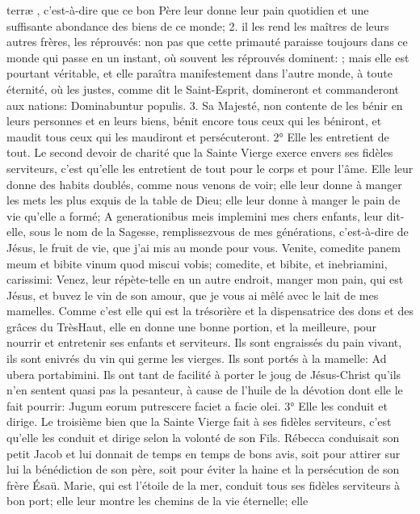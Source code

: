 terræ , c'est-à-dire que ce bon Père leur donne leur pain quotidien et une suffisante abondance des biens de ce
monde; 2. il les rend les maîtres de leurs autres frères, les réprouvés: non pas que cette primauté paraisse
toujours dans ce monde qui passe en un instant, où souvent les réprouvés dominent: ; mais elle est pourtant véritable, et elle paraîtra
manifestement dans l'autre monde, à toute éternité, où les justes, comme dit le Saint-Esprit, domineront et
commanderont aux nations: Dominabuntur populis. 3. Sa Majesté, non contente de les bénir en leurs personnes et
en leurs biens, bénit encore tous ceux qui les béniront, et maudit tous ceux qui les maudiront et persécuteront.
2° Elle les entretient de tout.
 Le second devoir de charité que la Sainte Vierge exerce envers ses fidèles serviteurs, c'est qu'elle les
entretient de tout pour le corps et pour l'âme. Elle leur donne des habits doublés, comme nous venons de voir; elle
leur donne à manger les mets les plus exquis de la table de Dieu; elle leur donne à manger le pain de vie qu'elle a
formé; A generationibus meis implemini mes chers enfants, leur dit-elle, sous le nom de la Sagesse, remplissezvous de mes générations, c'est-à-dire de Jésus, le fruit de vie, que j'ai mis au monde pour vous. Venite, comedite
panem meum et bibite vinum quod miscui vobis; comedite, et bibite, et inebriamini, carissimi: Venez, leur répète-telle en un autre endroit, manger mon pain, qui est Jésus, et buvez le vin de son amour, que je vous ai mêlé avec le
lait de mes mamelles. Comme c'est elle qui est la trésorière et la dispensatrice des dons et des grâces du TrèsHaut, elle en donne une bonne portion, et la meilleure, pour nourrir et entretenir ses enfants et serviteurs. Ils sont
engraissés du pain vivant, ils sont enivrés du vin qui germe les vierges. Ils sont portés à la mamelle: Ad ubera
portabimini. Ils ont tant de facilité à porter le joug de Jésus-Christ qu'ils n'en sentent quasi pas la pesanteur, à
cause de l'huile de la dévotion dont elle le fait pourrir: Jugum eorum putrescere faciet a facie olei.
3° Elle les conduit et dirige.
 Le troisième bien que la Sainte Vierge fait à ses fidèles serviteurs, c'est qu'elle les conduit et dirige selon la
volonté de son Fils. Rébecca conduisait son petit Jacob et lui donnait de temps en temps de bons avis, soit pour
attirer sur lui la bénédiction de son père, soit pour éviter la haine et la persécution de son frère Ésaü. Marie, qui est
l'étoile de la mer, conduit tous ses fidèles serviteurs à bon port; elle leur montre les chemins de la vie éternelle; elle
